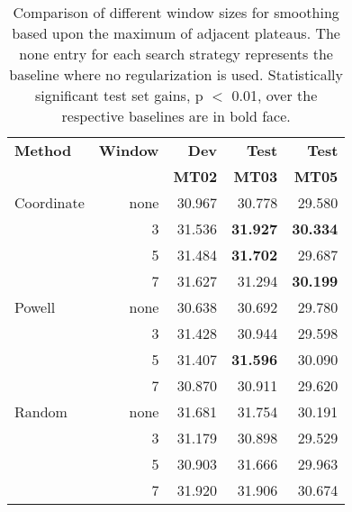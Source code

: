 \documentclass[11pt]{article}
\begin{document}
\begin{table}
\begin{center}
\begin{tabular}{|l|rrrr|}
\hline \bf Method  & \bf Window & \bf Dev & \bf Test & \bf Test \\
                   &            & \bf MT02 & \bf MT03 & \bf MT05 \\ \hline
Coordinate & none &  30.967 & 30.778 & 29.580 \\
           & 3  & 31.536  & {\bf 31.927} & {\bf 30.334} \\
           & 5  & 31.484   & {\bf 31.702}  &  29.687  \\
           & 7  & 31.627 &  31.294 & {\bf 30.199} \\ \hline
Powell     & none & 30.638 & 30.692 & 29.780 \\
           & 3  & 31.428  & 30.944  & 29.598 \\
           & 5  & 31.407  & {\bf 31.596} & 30.090  \\
           & 7  & 30.870  & 30.911 & 29.620  \\ \hline
Random     & none & 31.681 & 31.754 & 30.191 \\
           & 3  & 31.179 & 30.898 & 29.529 \\
           & 5  & 30.903 & 31.666 & 29.963 \\
           & 7  & 31.920 & 31.906 & 30.674 \\
\hline
\end{tabular}
\end{center}
\caption{
\label{minsmoothing}
Comparison of different window sizes for smoothing based upon the maximum of adjacent plateaus. 
The none entry for each search strategy represents the baseline where no regularization is used. Statistically significant test set gains, p \mbox{$<$} 0.01, over the respective baselines are in bold face. 
}
\end{table}


\end{document}
